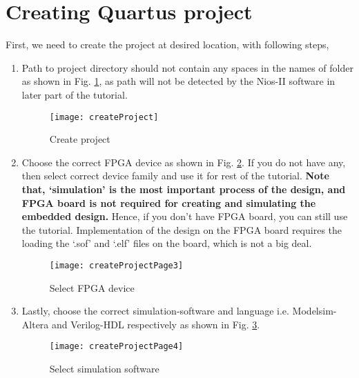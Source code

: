 


\section{Creating Quartus project} \label{sec:CreateQuartusProject}
First, we need to create the project at desired location, with following steps, 
\begin{enumerate}
	\item Path to project directory should not contain any spaces in the names of folder as shown in Fig. \ref{fig:createProject}, as path will not be detected by the Nios-II software in later part of the tutorial. 
	\begin{figure}[!h]
		\centering
		\texttt{[image: createProject]}
		\caption{Create project}
		\label{fig:createProject}
	\end{figure}
	
	\item Choose the correct FPGA device as shown in Fig. \ref{fig:createProjectPage3}. If you do not have any, then select correct device family and use it for rest of the tutorial. \textbf{Note that, `simulation' is the most important process of the design, and FPGA board is not required for creating and simulating the embedded design.} Hence, if you don't have FPGA board, you can still use the tutorial. Implementation of the design on the FPGA board requires the loading the `.sof' and `.elf' files on the board, which is not a big deal.  
	\begin{figure}[!h]
		\centering
		\texttt{[image: createProjectPage3]}
		\caption{Select FPGA device}
		\label{fig:createProjectPage3}
	\end{figure}
	
	\item Lastly, choose the correct simulation-software and language  i.e. Modelsim-Altera and Verilog-HDL respectively as shown in Fig. \ref{fig:createProjectPage4}.
	\begin{figure}[!h]
		\centering
		\texttt{[image: createProjectPage4]}
		\caption{Select simulation software}
		\label{fig:createProjectPage4}
	\end{figure}
\end{enumerate}


